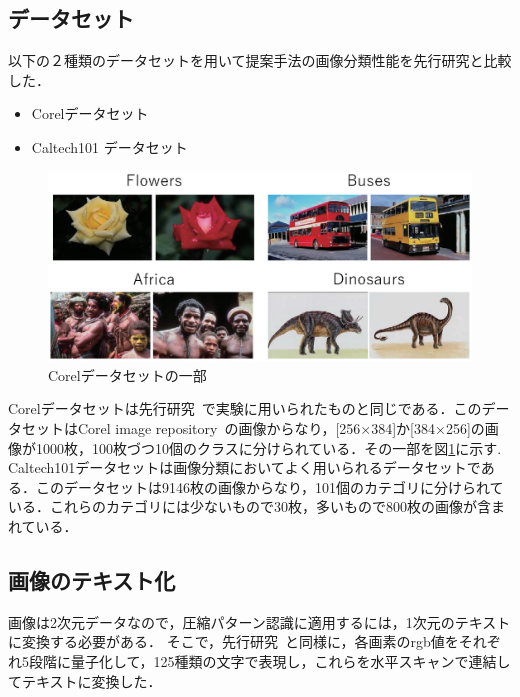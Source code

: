 \subsection{データセット}
以下の２種類のデータセットを用いて提案手法の画像分類性能を先行研究と比較した．
\begin{itemize}
	\item Corelデータセット~\cite{Corel}
	\item Caltech101 データセット~\cite{Caltech101}
\end{itemize}
\begin{figure}[tb]
\begin{center}
\includegraphics[clip, width=\columnwidth]{image/dataset.eps}
\caption{Corelデータセットの一部}
\label{fig:image/dataset.eps}
\end{center}
\end{figure}
Corelデータセットは先行研究~\cite{NMD}で実験に用いられたものと同じである．このデータセットはCorel image repository~\cite{Corel}の画像からなり，[256×384]か[384×256]の画像が1000枚，100枚づつ10個のクラスに分けられている．その一部を図\ref{fig:image/dataset.eps}に示す.
Caltech101データセットは画像分類においてよく用いられるデータセットである．このデータセットは9146枚の画像からなり，101個のカテゴリに分けられている．これらのカテゴリには少ないもので30枚，多いもので800枚の画像が含まれている．
\subsection{画像のテキスト化}
画像は2次元データなので，圧縮パターン認識に適用するには，1次元のテキストに変換する必要がある．
そこで，先行研究~\cite{NMD}と同様に，各画素のrgb値をそれぞれ5段階に量子化して，125種類の文字で表現し，これらを水平スキャンで連結してテキストに変換した．

